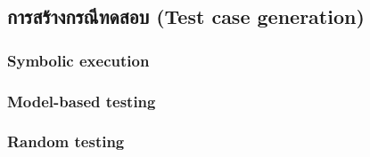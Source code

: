 \subsection{การสร้างกรณีทดสอบ (Test case generation)}


\subsubsection{Symbolic execution}
\subsubsection{Model-based testing}
\subsubsection{Random testing}
